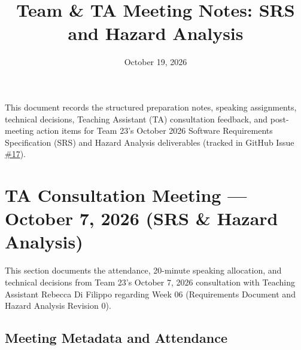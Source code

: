 \documentclass[11pt]{article}
\title{Team \& TA Meeting Notes: SRS and Hazard Analysis\\\progname}
\author{\authname}
\date{October 19, 2026}
\begin{document}
\maketitle

\tableofcontents

\vspace{1em}
\noindent This document records the structured preparation notes, speaking assignments, technical decisions, Teaching Assistant (TA) consultation feedback, and post-meeting action items for Team 23's October 2026 Software Requirements Specification (SRS) and Hazard Analysis deliverables (tracked in GitHub Issue \href{https://github.com/richy1337/Verity/issues/17}{\#17}).

\section{TA Consultation Meeting --- October 7, 2026 (SRS \& Hazard Analysis)}

This section documents the attendance, 20-minute speaking allocation, and technical decisions from Team 23's October 7, 2026 consultation with Teaching Assistant Rebecca Di Filippo regarding Week 06 (Requirements Document and Hazard Analysis Revision 0).

\subsection{Meeting Metadata and Attendance}
\end{document}
